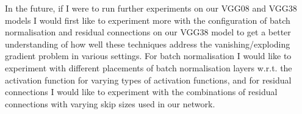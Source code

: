 {{%

In the future, if I were to run further experiments on our VGG08 and VGG38 models I would first like to experiment more with the configuration of batch normalisation and residual connections on our VGG38 model to get a better understanding of how well these techniques address the vanishing/exploding gradient problem in various settings. For batch normalisation I would like to experiment with different placements of batch normalisation layers w.r.t. the activation function for varying types of activation functions, and for residual connections I would like to experiment with the combinations of residual connections with varying skip sizes used in our network.


}}
